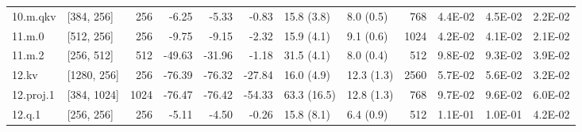 \begin{table}
\begin{tabular}{llrrrrllrrrr}
10.m.qkv & [384, 256] & 256 & {\cellcolor[HTML]{FBFDBA}} \color[HTML]{000000} -6.25 & {\cellcolor[HTML]{F8FCB6}} \color[HTML]{000000} -5.33 & {\cellcolor[HTML]{ECF7A6}} \color[HTML]{000000} -0.83 & 15.8 (3.8) & 8.0 (0.5) & 768 & {\cellcolor[HTML]{F1F9AC}} \color[HTML]{000000} 4.4E-02 & {\cellcolor[HTML]{F1F9AC}} \color[HTML]{000000} 4.5E-02 & {\cellcolor[HTML]{D1EC86}} \color[HTML]{000000} 2.2E-02 \\
11.m.0 & [512, 256] & 256 & {\cellcolor[HTML]{FFFBB8}} \color[HTML]{000000} -9.75 & {\cellcolor[HTML]{FFFCBA}} \color[HTML]{000000} -9.15 & {\cellcolor[HTML]{EFF8AA}} \color[HTML]{000000} -2.32 & 15.9 (4.1) & 9.1 (0.6) & 1024 & {\cellcolor[HTML]{ECF7A6}} \color[HTML]{000000} 4.2E-02 & {\cellcolor[HTML]{ECF7A6}} \color[HTML]{000000} 4.1E-02 & {\cellcolor[HTML]{D1EC86}} \color[HTML]{000000} 2.1E-02 \\
11.m.2 & [256, 512] & 512 & {\cellcolor[HTML]{F36B42}} \color[HTML]{F1F1F1} -49.63 & {\cellcolor[HTML]{FDB96A}} \color[HTML]{000000} -31.96 & {\cellcolor[HTML]{ECF7A6}} \color[HTML]{000000} -1.18 & 31.5 (4.1) & 8.0 (0.4) & 512 & {\cellcolor[HTML]{FEC877}} \color[HTML]{000000} 9.8E-02 & {\cellcolor[HTML]{FED27F}} \color[HTML]{000000} 9.3E-02 & {\cellcolor[HTML]{E9F6A1}} \color[HTML]{000000} 3.9E-02 \\
12.kv & [1280, 256] & 256 & {\cellcolor[HTML]{A50026}} \color[HTML]{F1F1F1} -76.39 & {\cellcolor[HTML]{A50026}} \color[HTML]{F1F1F1} -76.32 & {\cellcolor[HTML]{FEC877}} \color[HTML]{000000} -27.84 & 16.0 (4.9) & 12.3 (1.3) & 2560 & {\cellcolor[HTML]{FFFDBC}} \color[HTML]{000000} 5.7E-02 & {\cellcolor[HTML]{FFFEBE}} \color[HTML]{000000} 5.6E-02 & {\cellcolor[HTML]{E0F295}} \color[HTML]{000000} 3.2E-02 \\
12.proj.1 & [384, 1024] & 1024 & {\cellcolor[HTML]{A50026}} \color[HTML]{F1F1F1} -76.47 & {\cellcolor[HTML]{A50026}} \color[HTML]{F1F1F1} -76.42 & {\cellcolor[HTML]{E95538}} \color[HTML]{F1F1F1} -54.33 & 63.3 (16.5) & 12.8 (1.3) & 768 & {\cellcolor[HTML]{FECA79}} \color[HTML]{000000} 9.7E-02 & {\cellcolor[HTML]{FECC7B}} \color[HTML]{000000} 9.6E-02 & {\cellcolor[HTML]{FFFAB6}} \color[HTML]{000000} 6.0E-02 \\
12.q.1 & [256, 256] & 256 & {\cellcolor[HTML]{F8FCB6}} \color[HTML]{000000} -5.11 & {\cellcolor[HTML]{F5FBB2}} \color[HTML]{000000} -4.50 & {\cellcolor[HTML]{EBF7A3}} \color[HTML]{000000} -0.26 & 15.8 (8.1) & 6.4 (0.9) & 512 & {\cellcolor[HTML]{FDBD6D}} \color[HTML]{000000} 1.1E-01 & {\cellcolor[HTML]{FDBF6F}} \color[HTML]{000000} 1.0E-01 & {\cellcolor[HTML]{ECF7A6}} \color[HTML]{000000} 4.2E-02 \\

\end{tabular}
\end{table}
